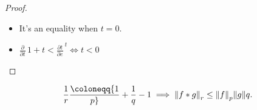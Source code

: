 \begin{proof}

\envlist

\begin{itemize}
\tightlist
\item
  It's an equality when \(t=0\).
\item
  \({\frac{\partial }{\partial t}\,} 1+ t < {\frac{\partial t}{\partial e}\,}^t \iff t<0\)
\end{itemize}

\end{proof}

\begin{proposition}

\begin{align*}
{1\over r} \coloneqq{1\over p} + {1\over q} - 1 \implies {\left\lVert {f \ast g} \right\rVert}_{r} \leq {\left\lVert {f} \right\rVert}_{p} {\left\lVert {g} \right\rVert}{q}
.\end{align*}

\end{proposition}


\printbibliography[title=Bibliography]



